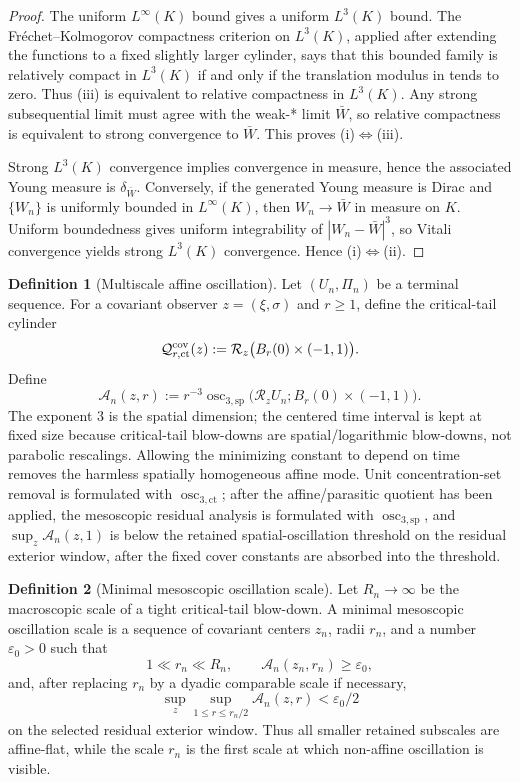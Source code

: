\documentclass[11pt]{amsart}
\numberwithin{equation}{section}
\theoremstyle{plain}
\theoremstyle{definition}
\newtheorem{definition}[definition]{Definition}
\theoremstyle{remark}
\newcommand{\calR}{\mathcal R}
\newcommand{\oscsp}{\operatorname{osc}_{3,\mathrm{sp}}}
\newcommand{\actthree}{\operatorname{osc}_{3,\mathrm{ct}}}
\begin{document}
\begin{proof}
The uniform \(L^\infty(K)\) bound gives a uniform \(L^3(K)\) bound.  The
Fr\'echet--Kolmogorov compactness criterion on \(L^3(K)\), applied after
extending the functions to a fixed slightly larger cylinder, says that this
bounded family is relatively compact in \(L^3(K)\) if and only if the
translation modulus in  tends to zero.  Thus
\textup{(iii)} is equivalent to relative compactness in \(L^3(K)\).  Any strong
subsequential limit must agree with the weak-* limit \(\bar W\), so relative
compactness is equivalent to strong convergence to \(\bar W\).  This proves
\textup{(i)}\(\Leftrightarrow\)\textup{(iii)}.

Strong \(L^3(K)\) convergence implies convergence in measure, hence the
associated Young measure is \(\delta_{\bar W}\).  Conversely, if the generated
Young measure is Dirac and \(\{W_n\}\) is uniformly bounded in \(L^\infty(K)\),
then \(W_n\to\bar W\) in measure on \(K\).  Uniform boundedness gives uniform
integrability of \(|W_n-\bar W|^3\), so Vitali convergence yields strong
\(L^3(K)\) convergence.  Hence
\textup{(i)}\(\Leftrightarrow\)\textup{(ii)}.
\end{proof}

\begin{definition}[Multiscale affine oscillation]
\label{def:multiscale-affine-oscillation}
Let \((U_n,\Pi_n)\) be a terminal sequence.  For a covariant observer
\(z=(\xi,\sigma)\) and \(r\ge1\), define the critical-tail cylinder
\[
   \mathcal Q_{r,\mathrm{ct}}^{\rm cov}(z)
   :=
   \calR_z\bigl(B_r(0)\times(-1,1)\bigr).
\]
Define
\[
   \mathcal A_n(z,r)
   :=
   r^{-3}
   \oscsp\bigl(\calR_zU_n;B_r(0)\times(-1,1)\bigr).
\]
The exponent \(3\) is the spatial dimension; the centered time interval is kept
at fixed size because critical-tail blow-downs are spatial/logarithmic
blow-downs, not parabolic rescalings.  Allowing the minimizing constant to
depend on time removes the harmless spatially homogeneous affine mode.  Unit
concentration-set removal is formulated with \(\actthree\); after the
affine/parasitic quotient has been applied, the mesoscopic residual analysis is
formulated with \(\oscsp\), and \(\sup_z\mathcal A_n(z,1)\) is below the retained
spatial-oscillation threshold on the residual exterior window, after the fixed
cover constants are absorbed into the threshold.
\end{definition}

\begin{definition}[Minimal mesoscopic oscillation scale]
\label{def:first-bad-mesoscopic-scale}
Let \(R_n\to\infty\) be the macroscopic scale of a tight critical-tail
blow-down.  A minimal mesoscopic oscillation scale is a sequence of covariant centers
\(z_n\), radii \(r_n\), and a number \(\varepsilon_0>0\) such that
\[
   1\ll r_n\ll R_n,
   \qquad
   \mathcal A_n(z_n,r_n)\ge\varepsilon_0,
\]
and, after replacing \(r_n\) by a dyadic comparable scale if necessary,
\[
   \sup_{z}\sup_{1\le r\le r_n/2}\mathcal A_n(z,r)
   <\varepsilon_0/2
\]
on the selected residual exterior window.  Thus all smaller retained
subscales are affine-flat, while the scale \(r_n\) is the first scale at which
non-affine oscillation is visible.
\end{definition}
\end{document}

